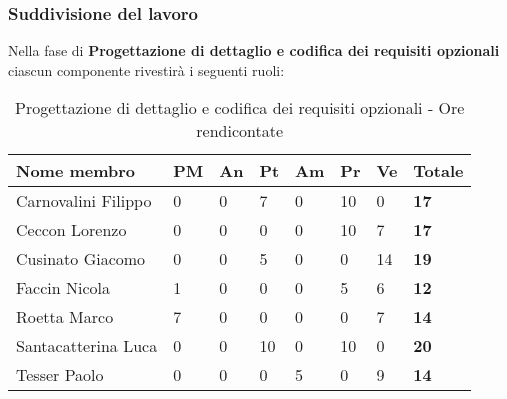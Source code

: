 		\subsubsection{Suddivisione del lavoro} %
		\label{ssub:suddivisione_del_lavoro}
		Nella fase di \textbf{Progettazione di dettaglio e codifica dei requisiti opzionali} ciascun componente rivestirà i seguenti ruoli: \\
			\begin{table}[!h]
				\begin{center}
					\begin{tabularx}{0.9\textwidth}{|l|l|l|l|l|l|l|X|}
						\hline
						\textbf{Nome membro} & \textbf{PM} & \textbf{An} & \textbf{Pt} & \textbf{Am} & \textbf{Pr} & \textbf{Ve} & \textbf{Totale} \\
						\hline
						Carnovalini Filippo & 0 & 0 & 7 & 0 & 10 & 0 & \textbf{17} \\
						\hline
						Ceccon Lorenzo & 0 & 0 & 0 & 0 & 10 & 7 & \textbf{17} \\
						\hline
						Cusinato Giacomo & 0 & 0 & 5 & 0 & 0 & 14 & \textbf{19} \\
						\hline
						Faccin Nicola & 1 & 0 & 0 & 0 & 5 & 6 & \textbf{12} \\
						\hline
						Roetta Marco & 7 & 0 & 0 & 0 & 0 & 7 & \textbf{14} \\
						\hline
						Santacatterina Luca & 0 & 0 & 10 & 0 & 10 & 0 & \textbf{20} \\
						\hline
						Tesser Paolo & 0 & 0 & 0 & 5 & 0 & 9 & \textbf{14} \\
						\hline		
					\end{tabularx}
				\end{center}
			\caption{Progettazione di dettaglio e codifica dei requisiti opzionali - Ore rendicontate}
			\end{table}
			
		
